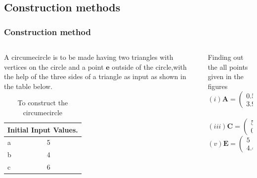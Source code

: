 \documentclass{beamer}
\renewcommand{\vec}[1]{\mathbf{#1}}
\begin{document}
		
		
	\subsection*{Construction methods}
	\begin{frame}[fragile]
	\footnotesize
	\frametitle{Construction method}
	\begin{columns}
		\begin{column}{0.5\textwidth}
			A circumecircle is to be made having two triangles with vertices on the circle and a point $\vec{e}$ outside of the circle,with the help of the three sides of a triangle as input as shown in the table below.
			
		\begin{table}[htbp]
		\centering
  		\resizebox{1\textwidth}{!}
  		{\begin{minipage}{\textwidth}
			\begin{tabular}{ |p{2cm}|p{2cm}|  }
			\hline
 			\multicolumn{2}{|c|}{Initial Input Values.} \\
			\hline
			a & 5\\
			\hline
			b & 4\\
			\hline
			c & 6\\
			\hline
			\end{tabular}
		\end{minipage}}
		\caption{\tiny To construct the circumecircle}
		\end{table}
	\end{column}

	\begin{column}{0.5\textwidth}
	Finding out the all points given in the figures 
	\newline
	$$(i)\vec{A}= \begin{pmatrix}0.5\\3.968\end{pmatrix}
	(ii)\vec{B}=\begin{pmatrix}0\\0\end{pmatrix}$$
	\\
	$$(iii)\vec{C}=\begin{pmatrix}5\\0\end{pmatrix}
	(iv)\vec{D}= \begin{pmatrix}4.5\\3.98\end{pmatrix}$$
	$$(v)\vec{E}=\begin{pmatrix}5\\4.40\end{pmatrix}$$
	\end{column}
\end{columns}
\end{frame}
\end{document}
